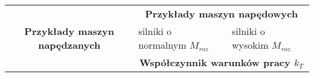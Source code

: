 \begin{table}[]\tiny
\centering
\begin{tabular}{|c|c|c|c|c|c|c|}
\hline
\multirow{5}{*}{\textbf{Przykłady maszyn napędzanych}}                                                                                                                                                                                                                                                                                                                                                      & \multicolumn{6}{c|}{\textbf{Przykłady maszyn napędowych}}                                                                                                                                                                                                                                                                                                                                                                                                                                                                                                                                                                                                                                                                                                            \\ \cline{2-7}
                                                                                                                                                                                                                                                                                                                                                                                                            & \multicolumn{3}{l|}{silniki o normalnym $M_{roz}$} & \multicolumn{3}{l|}{silniki o wysokim $M_{roz}$} \\ \cline{2-7}
                                                                                                                                                                                                                                                                                                                                                                                                            & \multicolumn{6}{c|}{\textbf{Współczynnik warunków pracy $k_{T}$}}                                                                                                                                                                                                                                                                                                                                                                                                                                                                                                                                                                                                                                                                                                    \\ \cline{2-7}

\end{tabular}
\end{table}
